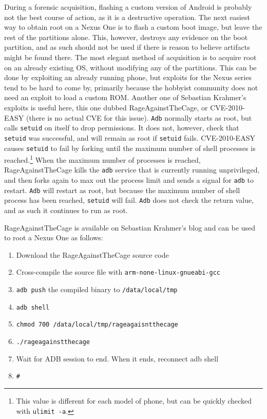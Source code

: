 During a forensic acquisition, flashing a custom version of Android is probably not the best course of action, as it is a
destructive operation.  The next easiest way to obtain root on a Nexus One is to flash a custom boot image, but leave the rest of
the partitions alone.  This, however, destroys any evidence on the boot partition, and as such should not be used if there is reason
to believe artifacts might be found there.  The most elegant method of acquisition is to acquire root on an already existing OS,
without modifying any of the partitions.  This can be done by exploiting an already running phone, but exploits for the Nexus series
tend to be hard to come by, primarily because the hobbyist community does not need an exploit to load a custom ROM.  Another one of
Sebastian Krahmer's exploits is useful here, this one dubbed RageAgainstTheCage, or CVE-2010-EASY (there is no actual CVE for this
issue).  \texttt{Adb} normally starts as root, but calls \texttt{setuid} on itself
to drop permissions.  It does not, however, check that \texttt{setuid} was successful, and will remain as root if \texttt{setuid}
fails.  CVE-2010-EASY causes \texttt{setuid} to fail by forking until the maximum number of shell processes is
reached.\footnote{This value is different for each model of phone, but can be quickly checked with \texttt{ulimit -a}.}  
When the maximum number of processes is reached, RageAgainstTheCage kills the \texttt{adb} service that is currently running
unprivileged, and then forks again to max out the process limit and sends a signal for \texttt{adb} to restart.  \texttt{Adb} will
restart as root, but because the maximum number of shell process has been reached, \texttt{setuid} will fail.  \texttt{Adb} does not
check the return value, and as such it continues to run as root.

RageAgainstTheCage is available on Sebastian Krahmer's blog and can be used to root a Nexus One as follows:
\begin{enumerate}
	\item Download the RageAgainstTheCage source code
	\item Cross-compile the source file with \texttt{arm-none-linux-gnueabi-gcc}
	\item \texttt{adb push} the compiled binary to \texttt{/data/local/tmp}
	\item \texttt{adb shell}
	\item \texttt{chmod 700 /data/local/tmp/rageagaisntthecage}
	\item \texttt{./rageagainstthecage}
	\item Wait for ADB session to end. When it ends, reconnect adb shell
	\item \texttt{\#}
\end{enumerate}	

